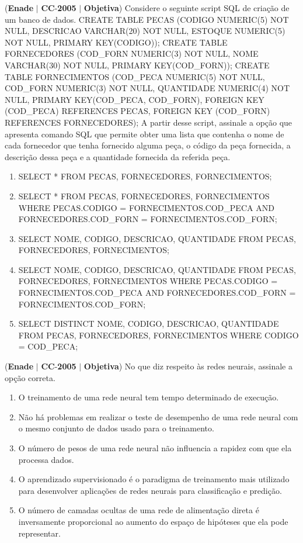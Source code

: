 \documentclass{exam}
\begin{document}
\begin{questions}
\question (\textbf{Enade} $|$ \textbf{CC}-\textbf{2005} $|$ \textbf{Objetiva})
Considere o seguinte script SQL de criação de um banco de
dados.
CREATE TABLE PECAS (CODIGO NUMERIC(5) NOT NULL,
DESCRICAO VARCHAR(20) NOT NULL,
ESTOQUE NUMERIC(5) NOT NULL,
PRIMARY KEY(CODIGO));
CREATE TABLE FORNECEDORES
(COD\_FORN NUMERIC(3) NOT NULL,
NOME VARCHAR(30) NOT NULL,
PRIMARY KEY(COD\_FORN));
CREATE TABLE FORNECIMENTOS
(COD\_PECA NUMERIC(5) NOT NULL,
COD\_FORN NUMERIC(3) NOT NULL,
QUANTIDADE NUMERIC(4) NOT NULL,
PRIMARY KEY(COD\_PECA, COD\_FORN),
FOREIGN KEY (COD\_PECA) REFERENCES PECAS,
FOREIGN KEY (COD\_FORN) REFERENCES
FORNECEDORES);
A partir desse script, assinale a opção que apresenta comando
SQL que permite obter uma lista que contenha o nome de cada
fornecedor que tenha fornecido alguma peça, o código da peça
fornecida, a descrição dessa peça e a quantidade fornecida da
referida peça.
	\begin{enumerate}[label=\alph*)]
		\item  SELECT * FROM PECAS, FORNECEDORES,
FORNECIMENTOS;
		\item  SELECT * FROM PECAS, FORNECEDORES,
FORNECIMENTOS WHERE PECAS.CODIGO =
FORNECIMENTOS.COD\_PECA AND
FORNECEDORES.COD\_FORN =
FORNECIMENTOS.COD\_FORN;
		\item  SELECT NOME, CODIGO, DESCRICAO, QUANTIDADE
FROM PECAS, FORNECEDORES, FORNECIMENTOS;
		\item  SELECT NOME, CODIGO, DESCRICAO, QUANTIDADE
FROM PECAS, FORNECEDORES, FORNECIMENTOS
WHERE PECAS.CODIGO = FORNECIMENTOS.COD\_PECA
AND FORNECEDORES.COD\_FORN =
FORNECIMENTOS.COD\_FORN;
		\item  SELECT DISTINCT NOME, CODIGO, DESCRICAO,
QUANTIDADE
FROM PECAS, FORNECEDORES, FORNECIMENTOS
WHERE CODIGO = COD\_PECA;
	\end{enumerate}

\question (\textbf{Enade} $|$ \textbf{CC}-\textbf{2005} $|$ \textbf{Objetiva})
No que diz respeito às redes neurais, assinale a opção correta.
	\begin{enumerate}[label=\alph*)]
		\item  O treinamento de uma rede neural tem tempo determinado de
execução.
		\item  Não há problemas em realizar o teste de desempenho de uma
rede neural com o mesmo conjunto de dados usado para o
treinamento.
		\item  O número de pesos de uma rede neural não influencia a
rapidez com que ela processa dados.
		\item  O aprendizado supervisionado é o paradigma de treinamento
mais utilizado para desenvolver aplicações de redes neurais
para classificação e predição.
		\item  O número de camadas ocultas de uma rede de alimentação
direta é inversamente proporcional ao aumento do espaço de
hipóteses que ela pode representar.
	\end{enumerate}


\end{questions}
\end{document}
